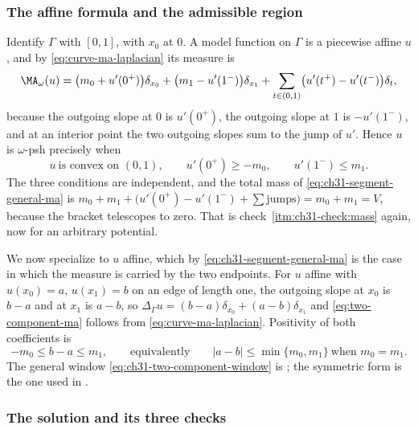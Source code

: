 \subsubsection*{The affine formula and the admissible region}

Identify \(\Gamma\) with \([0,1]\), with \(x_0\) at \(0\).  A model function
on \(\Gamma\) is a piecewise affine \(u\), and by
\eqref{eq:curve-ma-laplacian} its measure is
\begin{equation}
\label{eq:ch31-segment-general-ma}
 \MA_\omega(u)
 =\bigl(m_0+u'(0^+)\bigr)\delta_{x_0}
  +\bigl(m_1-u'(1^-)\bigr)\delta_{x_1}
  +\sum_{t\in(0,1)}\bigl(u'(t^+)-u'(t^-)\bigr)\delta_t ,
\end{equation}
because the outgoing slope at \(0\) is \(u'(0^+)\), the outgoing slope at
\(1\) is \(-u'(1^-)\), and at an interior point the two outgoing slopes sum
to the jump of \(u'\).  Hence \(u\) is \(\omega\)-psh precisely when
\begin{equation}
\label{eq:ch31-segment-psh}
 u\ \text{is convex on }(0,1),
 \qquad u'(0^+)\geq-m_0,
 \qquad u'(1^-)\leq m_1 .
\end{equation}
The three conditions are independent, and the total mass of
\eqref{eq:ch31-segment-general-ma} is
\(m_0+m_1+\bigl(u'(0^+)-u'(1^-)+\sum\text{jumps}\bigr)=m_0+m_1=V\), because
the bracket telescopes to zero.  That is
check~\cref{itm:ch31-check:mass} again, now for an arbitrary potential.

We now specialize to \(u\) affine, which by
\eqref{eq:ch31-segment-general-ma} is the case in which the measure is
carried by the two endpoints.  For \(u\) affine with
\(u(x_0)=a\), \(u(x_1)=b\) on an edge of length one,
the outgoing slope at \(x_0\) is \(b-a\) and at \(x_1\) is \(a-b\), so
\(\Delta_\Gamma u=(b-a)\delta_{x_0}+(a-b)\delta_{x_1}\) and
\eqref{eq:two-component-ma} follows from
\eqref{eq:curve-ma-laplacian}.  Positivity of both coefficients is
\begin{equation}
\label{eq:ch31-two-component-window}
 -m_0\leq b-a\leq m_1,
 \qquad\text{equivalently}\qquad
 |a-b|\leq\min\{m_0,m_1\}\ \text{when }m_0=m_1 .
\end{equation}
The general window \eqref{eq:ch31-two-component-window} is
; the symmetric form is the one used in
.

\subsubsection*{The solution and its three checks}

